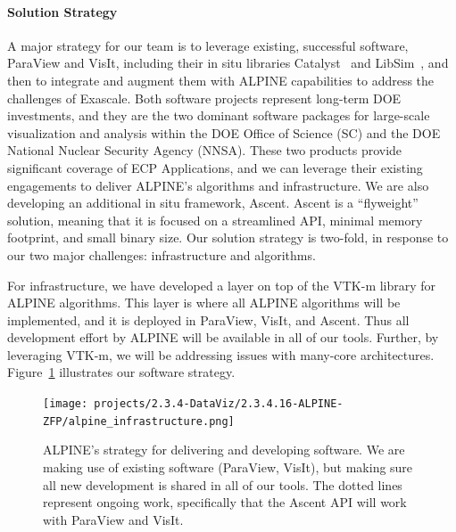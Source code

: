 \paragraph{Solution Strategy}

A major strategy for our team is to leverage existing, successful software, ParaView and VisIt, including their  in situ libraries Catalyst~\cite{Catalyst} and LibSim~\cite{alpine:LibSim}, and then to integrate and augment them with ALPINE capabilities to address the challenges of Exascale. 
%
Both software projects represent long-term DOE investments, and they are the two dominant software packages for large-scale visualization and analysis within the DOE Office of Science (SC) and the DOE National Nuclear Security Agency (NNSA). 
These two products provide significant coverage of ECP Applications, and we can leverage their existing engagements to deliver ALPINE's algorithms and infrastructure. 
%
We are also developing an additional  in situ framework, Ascent.  Ascent is a ``flyweight'' solution, meaning that it is focused on a streamlined API, minimal memory footprint, and small binary size.
Our solution strategy is two-fold, in response to our two major challenges: infrastructure and algorithms.

For infrastructure, we have developed a layer on top of the VTK-m library for ALPINE algorithms.
This layer is where all ALPINE algorithms will be implemented, and it is deployed in ParaView, VisIt, and Ascent.
Thus all development effort by ALPINE will be available in all of our tools.
Further, by leveraging VTK-m, we will be addressing issues with many-core architectures.
Figure~\ref{fig:alpine_infrastructure} illustrates our software strategy.

\begin{figure}[htb]
	\centering
	\texttt{[image: projects/2.3.4-DataViz/2.3.4.16-ALPINE-ZFP/alpine\_infrastructure.png]}
	\caption{\label{fig:alpine_infrastructure}ALPINE's strategy for delivering and developing software.  We are making use of existing software (ParaView, VisIt), but making sure all new development is shared in all of our tools.  The dotted lines represent ongoing work, specifically that the Ascent API will work with ParaView and VisIt.}
\end{figure}

